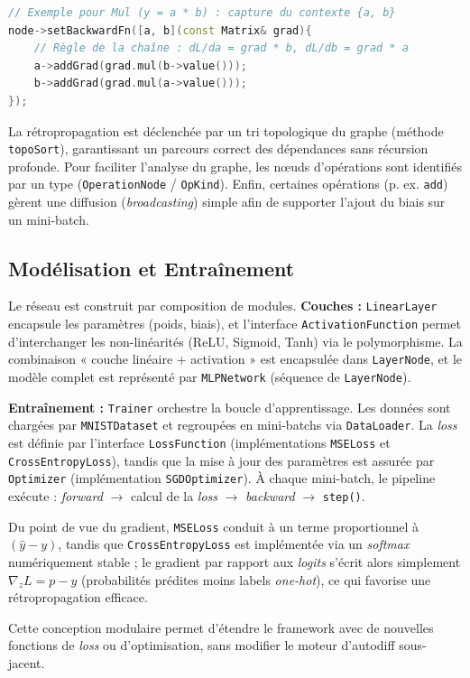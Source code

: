 \documentclass[a4paper,11pt]{article}
\begin{document}
\begin{lstlisting}[language=C++, caption={Rétropropagation via Lambda (MathOps)}]
// Exemple pour Mul (y = a * b) : capture du contexte {a, b}
node->setBackwardFn([a, b](const Matrix& grad){
    // Règle de la chaîne : dL/da = grad * b, dL/db = grad * a
    a->addGrad(grad.mul(b->value()));
    b->addGrad(grad.mul(a->value()));
});
\end{lstlisting}

La rétropropagation est déclenchée par un tri topologique du graphe (méthode \texttt{topoSort}), garantissant un parcours correct des dépendances sans récursion profonde. Pour faciliter l'analyse du graphe, les nœuds d'opérations sont identifiés par un type (\texttt{OperationNode} / \texttt{OpKind}). Enfin, certaines opérations (p. ex. \texttt{add}) gèrent une diffusion (\textit{broadcasting}) simple afin de supporter l'ajout du biais sur un mini-batch.

\subsection{Modélisation et Entraînement}
Le réseau est construit par composition de modules. \textbf{Couches :} \texttt{LinearLayer} encapsule les paramètres (poids, biais), et l'interface \texttt{ActivationFunction} permet d'interchanger les non-linéarités (ReLU, Sigmoid, Tanh) via le polymorphisme. La combinaison « couche linéaire + activation » est encapsulée dans \texttt{LayerNode}, et le modèle complet est représenté par \texttt{MLPNetwork} (séquence de \texttt{LayerNode}).
\par\smallskip
\noindent\textbf{Entraînement :} \texttt{Trainer} orchestre la boucle d'apprentissage. Les données sont chargées par \texttt{MNISTDataset} et regroupées en mini-batchs via \texttt{DataLoader}. La \textit{loss} est définie par l'interface \texttt{LossFunction} (implémentations \texttt{MSELoss} et \texttt{CrossEntropyLoss}), tandis que la mise à jour des paramètres est assurée par \texttt{Optimizer} (implémentation \texttt{SGDOptimizer}). À chaque mini-batch, le pipeline exécute : \textit{forward} $\rightarrow$ calcul de la \textit{loss} $\rightarrow$ \textit{backward} $\rightarrow$ \texttt{step()}.
\par\smallskip
\noindent Du point de vue du gradient, \texttt{MSELoss} conduit à un terme proportionnel à $(\hat{y}-y)$, tandis que \texttt{CrossEntropyLoss} est implémentée via un \textit{softmax} numériquement stable ; le gradient par rapport aux \textit{logits} s'écrit alors simplement $\nabla_z L = p - y$ (probabilités prédites moins labels \textit{one-hot}), ce qui favorise une rétropropagation efficace.
\par\smallskip
\noindent Cette conception modulaire permet d'étendre le framework avec de nouvelles fonctions de \textit{loss} ou d'optimisation, sans modifier le moteur d'autodiff sous-jacent.
\end{document}
